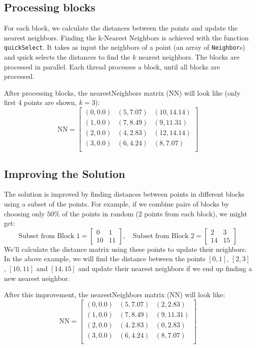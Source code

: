 \documentclass{article}
\begin{document}
\subsection{Processing blocks}
For each block, we calculate the distances between the points and update the nearest neighbors.
Finding the k-Nearest Neighbors is achieved with the function \texttt{quickSelect}. It takes as input
the neighbors of a point (an array of \texttt{Neighbor}s) and quick selects the distances to find the $k$ nearest neighbors.
The blocks are processed in parallel. Each thread processes a block, until all blocks are processed.

After processing blocks, the nearestNeighbors matrix (NN) will look like (only first 4 points are shown, $k=3$):
\[
\text{NN} = \begin{bmatrix}
(0, 0.0) & (5, 7.07) & (10, 14.14) \\
(1, 0.0) & (7, 8.49) & (9, 11.31) \\
(2, 0.0) & (4, 2.83) & (12, 14.14) \\
(3, 0.0) & (6, 4.24) & (8, 7.07) \\
\end{bmatrix}
\]

\subsection{Improving the Solution}
The solution is improved by finding distances between points in different blocks using a subset of the points. 
For example, if we combine pairs of blocks by choosing only $50\%$ of the points in random (2 points from each block),
we might get:
\[
\text{Subset from Block 1} = \begin{bmatrix}
0 & 1 \\
10 & 11
\end{bmatrix}, \quad
\text{Subset from Block 2} = \begin{bmatrix}
2 & 3 \\
14 & 15
\end{bmatrix}
\]
We'll calculate the distance matrix using these points to update their neighbors. In the above example, we will find the
distance between the points $[0, 1]$, $[2, 3]$, $[10, 11]$ and $[14, 15]$ and update their nearest neighbors if we end up finding a new
nearest neighbor.

After this improvement, the nearestNeighbors matrix (NN) will look like:
\[
\text{NN} = \begin{bmatrix}
(0, 0.0) & (5, 7.07) & (2, 2.83) \\
(1, 0.0) & (7, 8.49) & (9, 11.31) \\
(2, 0.0) & (4, 2.83) & (0, 2.83) \\
(3, 0.0) & (6, 4.24) & (8, 7.07) \\
\end{bmatrix}
\]
\end{document}
